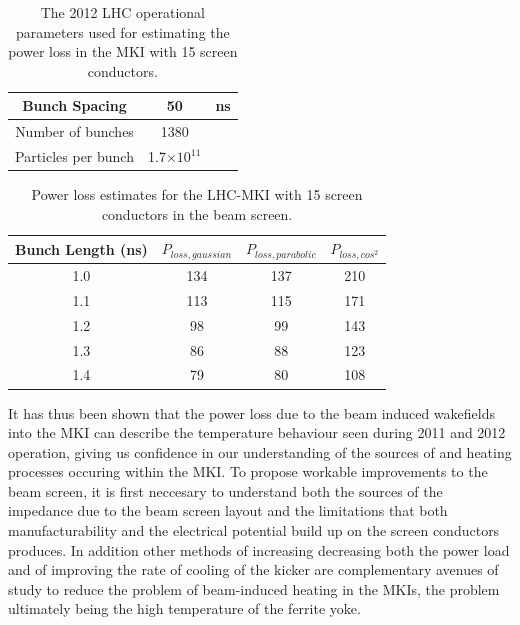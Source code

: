 \begin{table}
\label{tab:mki-beam-parameters}
\caption{The 2012 LHC operational parameters used for estimating the power loss in the MKI with 15 screen conductors.}
\begin{center}
\begin{tabular}{c | c | c}
Bunch Spacing & 50 & ns \\ \hline
Number of bunches & 1380 & \\ \hline
Particles per bunch & 1.7$\times 10^{11}$ & \\
\end{tabular}
\end{center}
\end{table}

\begin{table}
\label{tab:mki-15-heating}
\caption{Power loss estimates for the LHC-MKI with 15 screen conductors in the beam screen.}
\begin{center}
\begin{tabular}{c | c | c | c}
Bunch Length (ns) & $P_{loss, gaussian}$ & $P_{loss, parabolic}$ & $P_{loss, cos^{2}}$ \\ \hline
1.0 & 134 & 137 & 210 \\ \hline
1.1 & 113 & 115 & 171 \\ \hline
1.2 & 98 & 99 & 143 \\ \hline
1.3 & 86 & 88 & 123 \\ \hline
1.4 & 79 & 80 & 108 \\ \hline
\end{tabular}
\end{center}
\end{table}

It has thus been shown that the power loss due to the beam induced wakefields into the MKI can describe the temperature behaviour seen during 2011 and 2012 operation, giving us confidence in our understanding of the sources of and heating processes occuring within the MKI. To propose workable improvements to the beam screen, it is first neccesary to understand both the sources of the impedance due to the beam screen layout and the limitations that both manufacturability and the electrical potential build up on the screen conductors produces. In addition other methods of increasing decreasing both the power load and of improving the rate of cooling of the kicker are complementary avenues of study to reduce the problem of beam-induced heating in the MKIs, the problem ultimately being the high temperature of the ferrite yoke.

